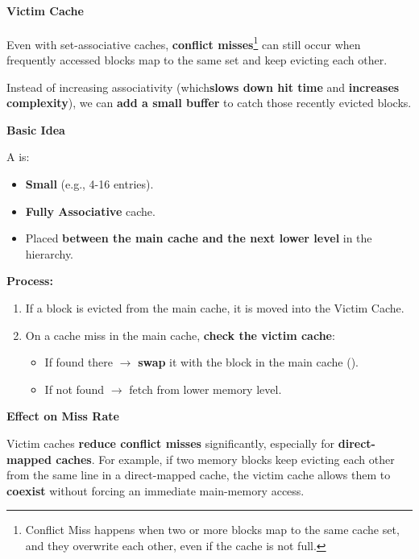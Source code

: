 \paragraph{Victim Cache}\label{paragraph: Victim Cache}

Even with set-associative caches, \textbf{conflict misses}\footnote{Conflict Miss happens when two or more blocks map to the same cache set, and they overwrite each other, even if the cache is not full.} can still occur when frequently accessed blocks map to the same set and keep evicting each other.

\highspace
Instead of increasing associativity (which\textbf{slows down hit time} and \textbf{increases complexity}), we can \textbf{add a small buffer} to catch those recently evicted blocks.

\highspace
\begin{flushleft}
    \textcolor{Green3}{ \textbf{Basic Idea}}
\end{flushleft}
A  is:
\begin{itemize}
    \item \textbf{Small} (e.g., 4-16 entries).
    \item \textbf{Fully Associative} cache.
    \item Placed \textbf{between the main cache and the next lower level} in the hierarchy.
\end{itemize}
\textbf{Process:}
\begin{enumerate}
    \item If a block is evicted from the main cache, it is moved into the Victim Cache.
    \item On a cache miss in the main cache, \textbf{check the victim cache}:
    \begin{itemize}
        \item If found there $\rightarrow$ \textbf{swap} it with the block in the main cache ().
        \item If not found $\rightarrow$ fetch from lower memory level.
    \end{itemize}
\end{enumerate}

\begin{flushleft}
    \textcolor{Green3}{\faIcon{\speedIcon} \textbf{Effect on Miss Rate}}    
\end{flushleft}
Victim caches \textbf{reduce conflict misses} significantly, especially for \textbf{direct-mapped caches}. For example, if two memory blocks keep evicting each other from the same line in a direct-mapped cache, the victim cache allows them to \textbf{coexist} without forcing an immediate main-memory access.

